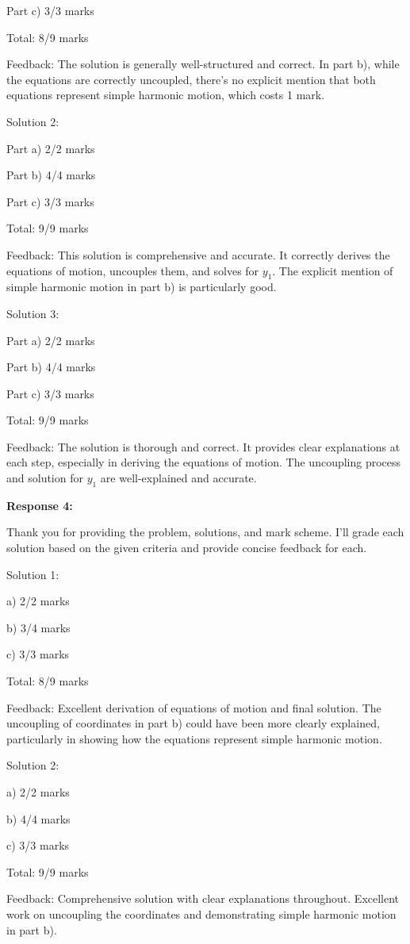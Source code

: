 \documentclass[a4paper,11pt]{article}
\begin{document}
Part c) 3/3 marks

Total: 8/9 marks

Feedback: The solution is generally well-structured and correct. In part b), while the equations are correctly uncoupled, there's no explicit mention that both equations represent simple harmonic motion, which costs 1 mark.

Solution 2:

Part a) 2/2 marks

Part b) 4/4 marks

Part c) 3/3 marks

Total: 9/9 marks

Feedback: This solution is comprehensive and accurate. It correctly derives the equations of motion, uncouples them, and solves for \(y_1\). The explicit mention of simple harmonic motion in part b) is particularly good.

Solution 3:

Part a) 2/2 marks

Part b) 4/4 marks

Part c) 3/3 marks

Total: 9/9 marks

Feedback: The solution is thorough and correct. It provides clear explanations at each step, especially in deriving the equations of motion. The uncoupling process and solution for \(y_1\) are well-explained and accurate.

\bigskip
\textbf{Response 4:}

Thank you for providing the problem, solutions, and mark scheme. I'll grade each solution based on the given criteria and provide concise feedback for each.

Solution 1:

a) 2/2 marks

b) 3/4 marks

c) 3/3 marks

Total: 8/9 marks

Feedback: Excellent derivation of equations of motion and final solution. The uncoupling of coordinates in part b) could have been more clearly explained, particularly in showing how the equations represent simple harmonic motion.

Solution 2:

a) 2/2 marks

b) 4/4 marks

c) 3/3 marks

Total: 9/9 marks

Feedback: Comprehensive solution with clear explanations throughout. Excellent work on uncoupling the coordinates and demonstrating simple harmonic motion in part b).
\end{document}
